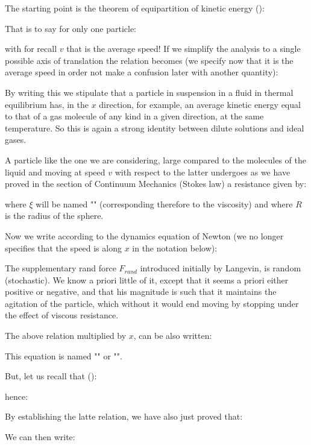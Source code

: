 	The starting point is the theorem of equipartition of kinetic energy ():
	
	That is to say for only one particle:
	
	with for recall $v$ that is the average speed! If we simplify the analysis to a single possible axis of translation the relation becomes (we specify now that it is the average speed in order not make a confusion later with another quantity):
	
	By writing this we stipulate that a particle in suspension in a fluid in thermal equilibrium has, in the $x$ direction, for example, an average kinetic energy equal to that of a gas molecule of any kind in a given direction, at the same temperature. So this is again a strong identity between dilute solutions and ideal gases.
	
	A particle like the one we are considering, large compared to the molecules of the liquid and moving at speed $v$ with respect to the latter undergoes as we have proved in the section of Continuum Mechanics (Stokes law) a resistance given by:
	
	where $\xi$ will be named "" (corresponding therefore to the viscosity) and where $R$ is the radius of the sphere.

	Now we write according to the dynamics equation of Newton (we no longer specifies that the speed is along $x$ in the notation below):
	
	The supplementary rand force $F_{rand}$ introduced initially by Langevin, is random (stochastic). We know a priori little of it, except that it seems a priori either positive or negative, and that his magnitude is such that it maintains the agitation of the particle, which without it would end moving by stopping under the effect of viscous resistance.

	The above relation multiplied by $x$, can be also written:
	
	
	This equation is named "" or "".

	But, let us recall that ():
	
	hence:
	
	By establishing the latte relation, we have also just proved that:
	
	We can then write:
	

